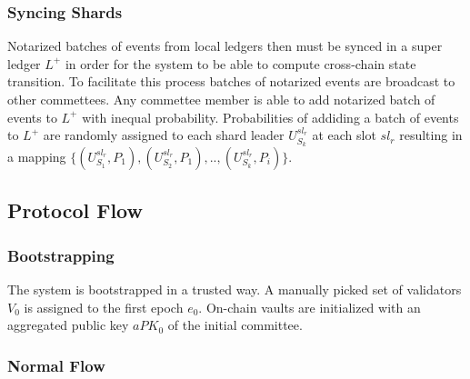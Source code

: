 \subsubsection{Syncing Shards}

Notarized batches of events from local ledgers then must be synced in a super ledger $L^+$ in order for the system to be able to compute cross-chain state transition.
To facilitate this process batches of notarized events are broadcast to other commettees.
Any commettee member is able to add notarized batch of events to $L^+$ with inequal probability.
Probabilities of addiding a batch of events to $L^+$ are randomly assigned to each shard leader $U^{sl_r}_{S_k}$ at each slot $sl_r$ resulting in a mapping $\{(U^{sl_r}_{S_1}, P_1), (U^{sl_r}_{S_2}, P_1), .., (U^{sl_r}_{S_k}, P_i)\}$.

\subsection{Protocol Flow}\label{subsec:protocol-flow}

\subsubsection{Bootstrapping}\label{subsubsec:bootstrapping}

The system is bootstrapped in a trusted way.
A manually picked set of validators $V_0$ is assigned to the first epoch $e_0$.
On-chain vaults are initialized with an aggregated public key $aPK_0$ of the initial committee.

\subsubsection{Normal Flow}\label{subsubsec:normal-flow}


